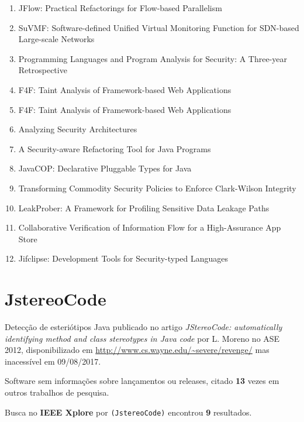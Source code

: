 \begin{enumerate}
\item JFlow: Practical Refactorings for Flow-based Parallelism
\item SuVMF: Software-defined Unified Virtual Monitoring Function for SDN-based Large-scale Networks
\item Programming Languages and Program Analysis for Security: A Three-year Retrospective
\item F4F: Taint Analysis of Framework-based Web Applications
\item F4F: Taint Analysis of Framework-based Web Applications
\item Analyzing Security Architectures
\item A Security-aware Refactoring Tool for Java Programs
\item JavaCOP: Declarative Pluggable Types for Java
\item Transforming Commodity Security Policies to Enforce Clark-Wilson Integrity
\item LeakProber: A Framework for Profiling Sensitive Data Leakage Paths
\item Collaborative Verification of Information Flow for a High-Assurance App Store
\item Jifclipse: Development Tools for Security-typed Languages
\end{enumerate}

\section{JstereoCode}

Detecção de esteriótipos Java
publicado no artigo {\it JStereoCode: automatically identifying method and class stereotypes in Java code}
por L. Moreno
no ASE 2012,
disponibilizado em \url{http://www.cs.wayne.edu/~severe/revenge/}
mas inacessível em 09/08/2017.

Software sem informações sobre lançamentos ou releases,
citado {\bf 13} vezes em outros trabalhos de pesquisa.

Busca no {\bf IEEE Xplore} por
\texttt{(JstereoCode)}
encontrou {\bf 9}
resultados.

